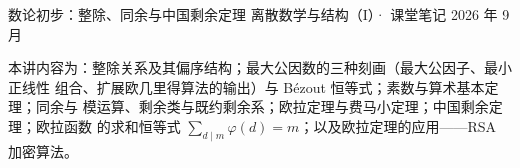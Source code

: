 \documentclass[cjk]{loom}
\begin{document}
\loomcover
  {数论初步：整除、同余与中国剩余定理}
  {离散数学与结构（I）· 课堂笔记}
  {}
  {2026 年 9 月}

\begin{strand}
本讲内容为：整除关系及其偏序结构；最大公因数的三种刻画（最大公因子、最小正线性
组合、扩展欧几里得算法的输出）与 Bézout 恒等式；素数与算术基本定理；同余与
模运算、剩余类与既约剩余系；欧拉定理与费马小定理；中国剩余定理；欧拉函数
的求和恒等式 $\sum_{d\mid m}\varphi(d)=m$；以及欧拉定理的应用——RSA 加密算法。
\end{strand}

\clearpage
{\small\tableofcontents}

\clearpage








\end{document}
